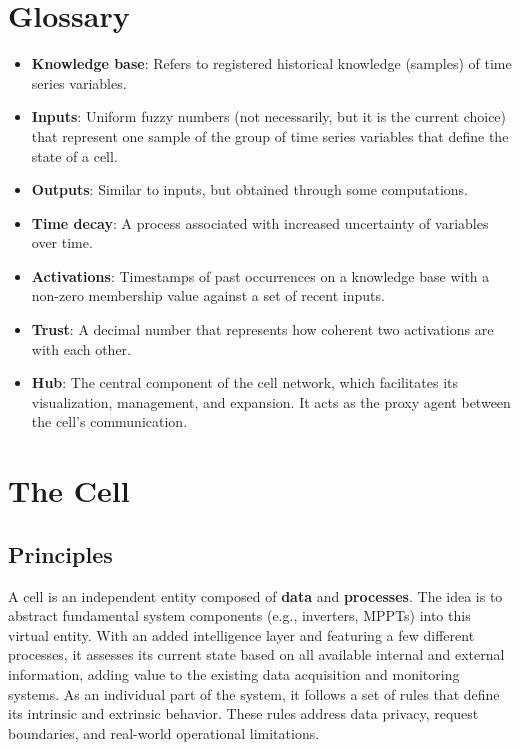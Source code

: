 \section{Glossary} \label{sec:glossary}


\begin{itemize}
    \item \textbf{Knowledge base}: Refers to registered historical knowledge (samples) of time series variables.

    \item \textbf{Inputs}: Uniform fuzzy numbers (not necessarily, but it is the current choice) that represent one sample of the group of time series variables that define the state of a cell.

    \item \textbf{Outputs}: Similar to inputs, but obtained through some computations.

    \item \textbf{Time decay}: A process associated with increased uncertainty of variables over time.

    \item \textbf{Activations}: Timestamps of past occurrences on a knowledge base with a non-zero membership value against a set of recent inputs.

    \item \textbf{Trust}: A decimal number that represents how coherent two activations are with each other.

    \item \textbf{Hub}: The central component of the cell network, which facilitates its visualization, management, and expansion. It acts as the proxy agent between the cell's communication.

\end{itemize}

\section{The Cell} \label{sec:thecell}


\subsection{Principles}

A cell is an independent entity composed of \textbf{data} and \textbf{processes}. The idea is to abstract fundamental system components (e.g., inverters, MPPTs) into this virtual entity. With an added intelligence layer and featuring a few different processes, it assesses its current state based on all available internal and external information, adding value to the existing data acquisition and monitoring systems. As an individual part of the system, it follows a set of rules that define its intrinsic and extrinsic behavior. These rules address data privacy, request boundaries, and real-world operational limitations.


